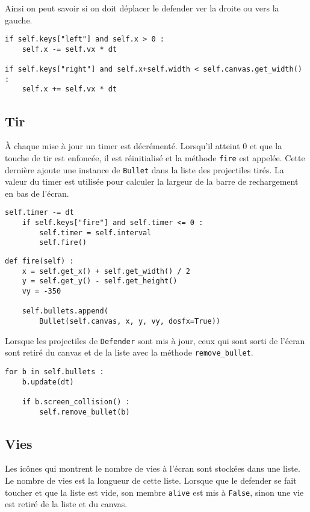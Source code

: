 \documentclass[12pt]{article}
\begin{document}
	Ainsi on peut savoir si on doit déplacer le defender ver la droite ou vers la gauche.

\begin{verbatim}
if self.keys["left"] and self.x > 0 :
	self.x -= self.vx * dt

if self.keys["right"] and self.x+self.width < self.canvas.get_width() :
	self.x += self.vx * dt
\end{verbatim}

		
	\subsection{Tir}

	À chaque mise à jour un timer est décrémenté. Lorsqu'il atteint 0 et que la touche de tir est enfoncée, il est réinitialisé et la méthode \texttt{fire} est appelée. Cette dernière ajoute une instance de \texttt{Bullet} dans la liste des projectiles tirés. La valeur du timer est utilisée pour calculer la largeur de la barre de rechargement en bas de l'écran.

\begin{verbatim}
self.timer -= dt
	if self.keys["fire"] and self.timer <= 0 :
		self.timer = self.interval
		self.fire()
\end{verbatim}


\begin{verbatim}
def fire(self) :
	x = self.get_x() + self.get_width() / 2
	y = self.get_y() - self.get_height()
	vy = -350

	self.bullets.append(
		Bullet(self.canvas, x, y, vy, dosfx=True))
\end{verbatim}


	Lorsque les projectiles de \texttt{Defender} sont mis à jour, ceux qui sont sorti de l'écran sont retiré du canvas et de la liste avec la méthode \texttt{remove\_bullet}.

\begin{verbatim}
for b in self.bullets :
	b.update(dt)

	if b.screen_collision() :
		self.remove_bullet(b)
\end{verbatim}


	\subsection{Vies}
	Les icônes qui montrent le nombre de vies à l'écran sont stockées dans une liste. Le nombre de vies est la longueur de cette liste. Lorsque que le defender se fait toucher et que la liste est vide, son membre \texttt{alive} est mis à \texttt{False}, sinon une vie est retiré de la liste et du canvas.
\end{document}
